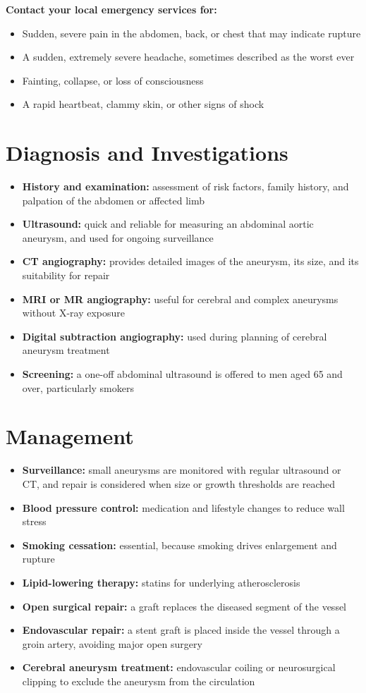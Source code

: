 \textbf{Contact your local emergency services for:}
\begin{itemize}
    \item Sudden, severe pain in the abdomen, back, or chest that may indicate rupture
    \item A sudden, extremely severe headache, sometimes described as the worst ever
    \item Fainting, collapse, or loss of consciousness
    \item A rapid heartbeat, clammy skin, or other signs of shock
\end{itemize}

\section*{Diagnosis and Investigations}
\begin{itemize}
    \item \textbf{History and examination:} assessment of risk factors, family history, and palpation of the abdomen or affected limb
    \item \textbf{Ultrasound:} quick and reliable for measuring an abdominal aortic aneurysm, and used for ongoing surveillance
    \item \textbf{CT angiography:} provides detailed images of the aneurysm, its size, and its suitability for repair
    \item \textbf{MRI or MR angiography:} useful for cerebral and complex aneurysms without X-ray exposure
    \item \textbf{Digital subtraction angiography:} used during planning of cerebral aneurysm treatment
    \item \textbf{Screening:} a one-off abdominal ultrasound is offered to men aged 65 and over, particularly smokers
\end{itemize}

\section*{Management}
\begin{itemize}
    \item \textbf{Surveillance:} small aneurysms are monitored with regular ultrasound or CT, and repair is considered when size or growth thresholds are reached
    \item \textbf{Blood pressure control:} medication and lifestyle changes to reduce wall stress
    \item \textbf{Smoking cessation:} essential, because smoking drives enlargement and rupture
    \item \textbf{Lipid-lowering therapy:} statins for underlying atherosclerosis
    \item \textbf{Open surgical repair:} a graft replaces the diseased segment of the vessel
    \item \textbf{Endovascular repair:} a stent graft is placed inside the vessel through a groin artery, avoiding major open surgery
    \item \textbf{Cerebral aneurysm treatment:} endovascular coiling or neurosurgical clipping to exclude the aneurysm from the circulation
\end{itemize}

